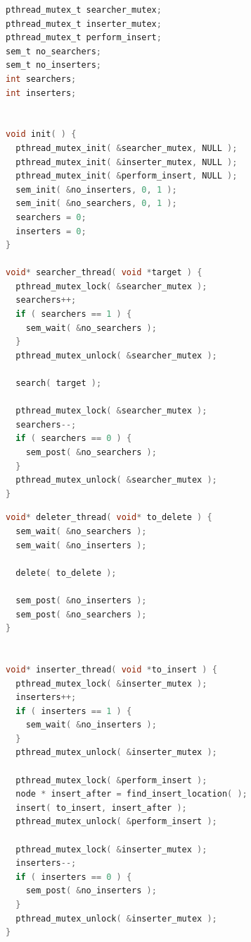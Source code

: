 \documentclass[a4paper]{report}
\begin{document}
	{\scriptsize
		\begin{multicols}{2}

			\begin{lstlisting}[language=C]
pthread_mutex_t searcher_mutex;
pthread_mutex_t inserter_mutex;
pthread_mutex_t perform_insert;
sem_t no_searchers;
sem_t no_inserters;
int searchers;
int inserters;


void init( ) {
  pthread_mutex_init( &searcher_mutex, NULL );
  pthread_mutex_init( &inserter_mutex, NULL );
  pthread_mutex_init( &perform_insert, NULL );
  sem_init( &no_inserters, 0, 1 );
  sem_init( &no_searchers, 0, 1 );
  searchers = 0;
  inserters = 0;
}

void* searcher_thread( void *target ) {
  pthread_mutex_lock( &searcher_mutex );
  searchers++;
  if ( searchers == 1 ) {
    sem_wait( &no_searchers );
  }
  pthread_mutex_unlock( &searcher_mutex );
  
  search( target );
  
  pthread_mutex_lock( &searcher_mutex );
  searchers--;
  if ( searchers == 0 ) {
    sem_post( &no_searchers );
  }
  pthread_mutex_unlock( &searcher_mutex );
}
\end{lstlisting}
			\columnbreak
			\begin{lstlisting}[language=C]
void* deleter_thread( void* to_delete ) {
  sem_wait( &no_searchers );
  sem_wait( &no_inserters );
  
  delete( to_delete );
  
  sem_post( &no_inserters );
  sem_post( &no_searchers );
}


void* inserter_thread( void *to_insert ) {
  pthread_mutex_lock( &inserter_mutex );
  inserters++;
  if ( inserters == 1 ) {
    sem_wait( &no_inserters );
  }
  pthread_mutex_unlock( &inserter_mutex );
  
  pthread_mutex_lock( &perform_insert );
  node * insert_after = find_insert_location( );
  insert( to_insert, insert_after );
  pthread_mutex_unlock( &perform_insert );
  
  pthread_mutex_lock( &inserter_mutex );
  inserters--;
  if ( inserters == 0 ) {
    sem_post( &no_inserters );
  }
  pthread_mutex_unlock( &inserter_mutex );
}
\end{lstlisting}
		\end{multicols}
	}
\end{document}
